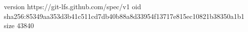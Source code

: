 version https://git-lfs.github.com/spec/v1
oid sha256:85349aa353d3b41c511cd7db40b88a8d33954f13717e815ec10821b38350a1b1
size 43840
